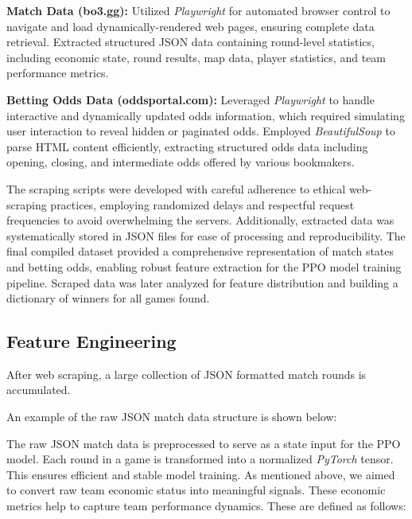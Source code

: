 \documentclass[sigconf]{acmart}
\begin{document}
\vspace{1em}

\textbf{Match Data (bo3.gg):}
Utilized \textit{Playwright} for automated browser control to navigate and load dynamically-rendered web pages, ensuring complete data retrieval.
Extracted structured JSON data containing round-level statistics, including economic state, round results, map data, player statistics, and team performance metrics.

\textbf{Betting Odds Data (oddsportal.com):}
Leveraged \textit{Playwright} to handle interactive and dynamically updated odds information, which required simulating user interaction to reveal hidden or paginated odds.
Employed \textit{BeautifulSoup} to parse HTML content efficiently, extracting structured odds data including opening, closing, and intermediate odds offered by various bookmakers.

\vspace{1em}

The scraping scripts were developed with careful adherence to ethical web-scraping practices, employing randomized delays and respectful request frequencies to avoid overwhelming the servers. Additionally, extracted data was systematically stored in JSON files for ease of processing and reproducibility. The final compiled dataset provided a comprehensive representation of match states and betting odds, enabling robust feature extraction for the PPO model training pipeline. Scraped data was later analyzed for feature distribution and building a dictionary of winners for all games found.

\subsection{Feature Engineering}

After web scraping, a large collection of JSON formatted match rounds is accumulated. 

An example of the raw JSON match data structure is shown below:


The raw JSON match data is preprocessed to serve as a state input for the PPO model. Each round in a game is transformed into a normalized \textit{PyTorch} tensor. This ensures efficient and stable model training. As mentioned above, we aimed to convert raw team economic status into meaningful signals. These economic metrics help to capture team performance dynamics. These are defined as follows:

\vspace{1em}
\end{document}
